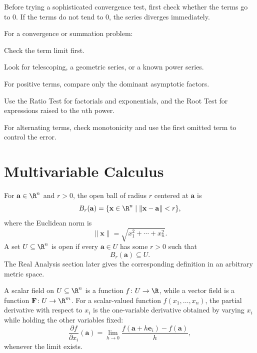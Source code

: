     \begin{strategy}
        Before trying a sophisticated convergence test, first check whether the
        terms go to $0$. If the terms do not tend to $0$, the series diverges
        immediately.
    \end{strategy}

    \begin{algorithm}
        For a convergence or summation problem:
        \begin{bookitems}
            \item Check the term limit first.
            \item Look for telescoping, a geometric series, or a known power
                  series.
            \item For positive terms, compare only the dominant asymptotic
                  factors.
            \item Use the Ratio Test for factorials and exponentials, and the
                  Root Test for expressions raised to the $n$th power.
            \item For alternating terms, check monotonicity and use the first
                  omitted term to control the error.
        \end{bookitems}
    \end{algorithm}

    \section*{Multivariable Calculus}

    \begin{definition}
        For $\mathbf{a}\in\R^n$ and $r>0$, the open ball of radius $r$ centered at
        $\mathbf{a}$ is
        \[
            B_r(\mathbf{a})
            =
            \{\mathbf{x}\in\R^n\mid \|\mathbf{x}-\mathbf{a}\|<r\},
        \]
        where the Euclidean norm is
        \[
            \|\mathbf{x}\|
            =
            \sqrt{x_1^2+\cdots+x_n^2}.
        \]
        A set $U\subseteq\R^n$ is open if every $\mathbf{a}\in U$ has some
        $r>0$ such that
        \[
            B_r(\mathbf{a})\subseteq U.
        \]
        The Real Analysis section later gives the corresponding definition in an
        arbitrary metric space.
    \end{definition}

    \begin{definition}
        A scalar field on $U\subseteq\R^n$ is a function $f\colon U\to\R$, while a
        vector field is a function $\mathbf{F}\colon U\to\R^m$. For a scalar-valued
        function $f(x_1,\dots,x_n)$, the partial derivative with respect to
        $x_i$ is the one-variable derivative obtained by varying $x_i$ while
        holding the other variables fixed:
        \[
            \frac{\partial f}{\partial x_i}(\mathbf{a})
            =
            \lim\limits_{h\to0}
            \frac{f(\mathbf{a}+h\mathbf{e}_i)-f(\mathbf{a})}{h},
        \]
        whenever the limit exists.
    \end{definition}


